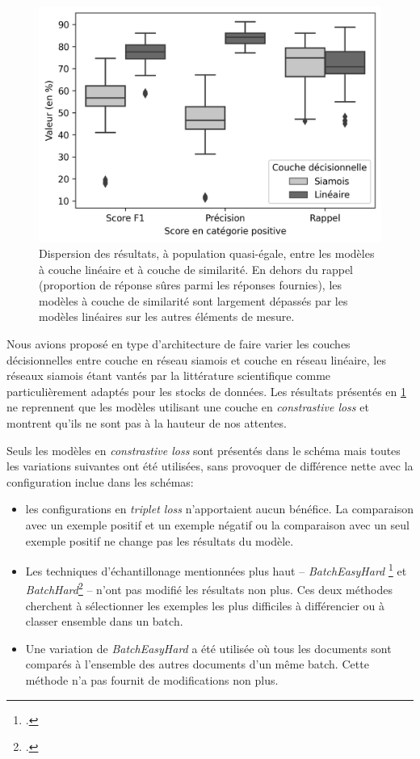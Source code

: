 \begin{figure}[p]
    \centering
    \includegraphics{figures/chap4/SiameseVsLinear.png}
    \caption{Dispersion des résultats, à population quasi-égale, entre les modèles à couche linéaire et à couche de similarité. En dehors du rappel (proportion de réponse sûres parmi les réponses fournies), les modèles à couche de similarité sont largement dépassés par les modèles linéaires sur les autres éléments de mesure.}
    \label{fig:chap4:modeles-siamois-vs-lineaires}
\end{figure}

Nous avions proposé en type d'architecture de faire varier les couches décisionnelles entre couche en réseau siamois et couche en réseau linéaire, les réseaux siamois étant vantés par la littérature scientifique comme particulièrement adaptés pour les stocks de données. Les résultats présentés en \ref{fig:chap4:modeles-siamois-vs-lineaires} ne reprennent que les modèles utilisant une couche en \textit{constrastive loss} et montrent qu'ils ne sont pas à la hauteur de nos attentes.

Seuls les modèles en \textit{constrastive loss} sont présentés dans le schéma mais toutes les variations suivantes ont été utilisées, sans provoquer de différence nette avec la configuration inclue dans les schémas:
\begin{itemize}
    \item les configurations en \textit{triplet loss} n'apportaient aucun bénéfice. La comparaison avec un exemple positif et un exemple négatif ou la comparaison avec un seul exemple positif ne change pas les résultats du modèle.
    \item Les techniques d'échantillonage mentionnées plus haut -- \textit{BatchEasyHard} \footcite{xuan_improved_2020} et \textit{BatchHard}\footcite{hermans_defense_2017} -- n'ont pas modifié les résultats non plus. Ces deux méthodes cherchent à sélectionner les exemples les plus difficiles à différencier ou à classer ensemble dans un batch.
    \item Une variation de \textit{BatchEasyHard} a été utilisée où tous les documents sont comparés à l'ensemble des autres documents d'un même batch. Cette méthode n'a pas fournit de modifications non plus.
\end{itemize}

